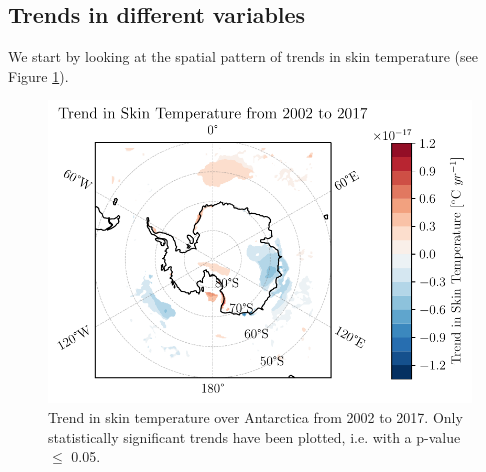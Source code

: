\documentclass[../main.tex]{subfiles}
\begin{document}
\subsection{Trends in different variables}
We start by looking at the spatial pattern of trends in skin temperature (see Figure \ref{fig:trend_skt_02_17}).
\begin{figure}[!hbt]
    \centering
    \includegraphics{images/2021w5/chapter7/hres/trend_spatial_skt}
    \caption{Trend in skin temperature over Antarctica from 2002 to 2017. Only statistically significant trends have been plotted, i.e. with a p-value $\leq$ 0.05.}
    \label{fig:trend_skt_02_17}
\end{figure}
\end{document}
